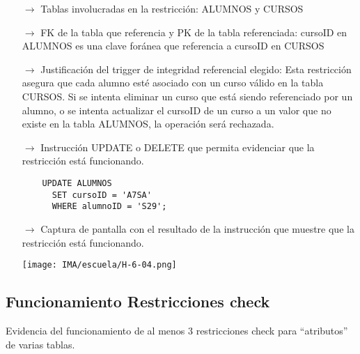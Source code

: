 \begin{itemize}
  \item[$\rightarrow$] Tablas involucradas en la restricción: ALUMNOS y CURSOS
  \item[$\rightarrow$] FK de la tabla que referencia y PK de la tabla referenciada: cursoID en ALUMNOS es una clave foránea que referencia a cursoID en CURSOS
  \item[$\rightarrow$] Justificación del trigger de integridad referencial elegido: Esta restricción asegura que cada alumno esté asociado con un curso válido en la tabla CURSOS. Si se intenta eliminar un curso que está siendo referenciado por un alumno, o se intenta actualizar el cursoID de un curso a un valor que no existe en la tabla ALUMNOS, la operación será rechazada.
  \item[$\rightarrow$] Instrucción UPDATE o DELETE que permita evidenciar que la restricción está funcionando.
  \begin{verbatim}
    UPDATE ALUMNOS
      SET cursoID = 'A7SA'
      WHERE alumnoID = 'S29';
  \end{verbatim}
  \item[$\rightarrow$] Captura de pantalla con el resultado de la instrucción que muestre que la restricción está funcionando.
  \begin{center}
    \texttt{[image: IMA/escuela/H-6-04.png]}
  \end{center}
\end{itemize}

\subsection{Funcionamiento Restricciones check}

Evidencia del funcionamiento de al menos 3 restricciones check para “atributos” de varias
tablas.


